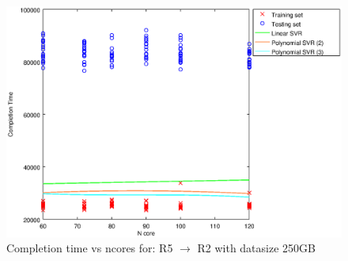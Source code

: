 
\begin {figure}[hbtp]
\centering
\includegraphics[width=\textwidth]{output/R5_R2_250_ALL_FEATURES/plot_R5_R2_250_bestmodels.eps}
\caption{Completion time vs ncores for: R5 $\rightarrow$ R2 with datasize 250GB}
\label{fig:coreonly_linear_R5_R2_250}
\end {figure}

